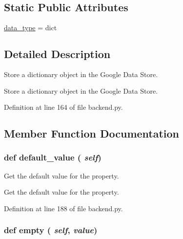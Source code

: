 \subsection*{Static Public Attributes}
\begin{DoxyCompactItemize}
\item 
\hyperlink{classbackend_1_1_dict_property_ac2ad7f431e3446fddcd9b6b9f93c4c14}{data\_\-type} = dict
\end{DoxyCompactItemize}


\subsection{Detailed Description}
Store a dictionary object in the Google Data Store. \begin{DoxyVerb}Store a dictionary object in the Google Data Store.\end{DoxyVerb}
 

Definition at line 164 of file backend.py.



\subsection{Member Function Documentation}
\hypertarget{classbackend_1_1_dict_property_a64bfffc058d933b3b0599f5bc7c049d1}{
\subsubsection[{default\_\-value}]{\setlength{\rightskip}{0pt plus 5cm}def default\_\-value ( {\em self})}}
\label{classbackend_1_1_dict_property_a64bfffc058d933b3b0599f5bc7c049d1}


Get the default value for the property. 

\begin{DoxyVerb}Get the default value for the property.\end{DoxyVerb}
 

Definition at line 188 of file backend.py.

\hypertarget{classbackend_1_1_dict_property_aad7084fad37d1cf9b41a738ecfbbd249}{
\subsubsection[{empty}]{\setlength{\rightskip}{0pt plus 5cm}def empty ( {\em self}, \/   {\em value})}}
\label{classbackend_1_1_dict_property_aad7084fad37d1cf9b41a738ecfbbd249}


